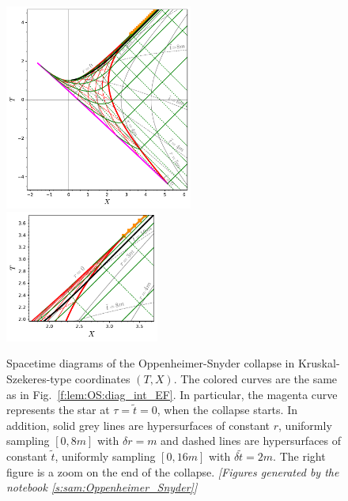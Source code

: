 \begin{figure}
\centerline{
\includegraphics[width=0.55\textwidth]{lem_OS_diag_KS.pdf}\quad
\includegraphics[width=0.45\textwidth]{lem_OS_diag_KS_zoom.pdf}
}
\caption[]{\label{f:lem:OS:diag_KS} \footnotesize
Spacetime diagrams of the Oppenheimer-Snyder collapse
in Kruskal-Szekeres-type coordinates $(T,X)$.
The colored curves are the same as in Fig.~\ref{f:lem:OS:diag_int_EF}.
In particular, the magenta curve represents the star at $\tau = \tilde{t} = 0$,
when the collapse starts. In addition, solid grey
lines are hypersurfaces of constant $r$, uniformly sampling $[0, 8m]$
with $\delta r = m$ and dashed lines are hypersurfaces of
constant $\tilde{t}$, uniformly sampling $[0, 16m]$ with
$\delta\tilde{t} = 2 m$.
The right figure is a zoom on the end of the collapse.
\textsl{[Figures generated by the notebook \ref{s:sam:Oppenheimer_Snyder}]}
}
\end{figure}

